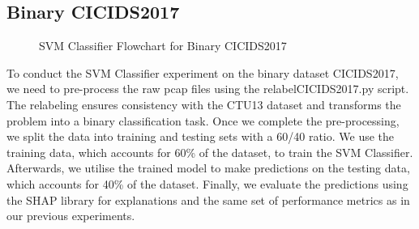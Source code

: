 \subsection{Binary CICIDS2017}\label{subsec:SVMClassifierBinaryCICIDS2017}
\begin{figure}[H]
\centering
{}
\caption{SVM Classifier Flowchart for Binary CICIDS2017}\label{fig:SVMFlowBinaryCICIDS2017}
\end{figure}

To conduct the SVM Classifier experiment on the binary dataset CICIDS2017, we need to pre-process the raw pcap files using the relabelCICIDS2017.py script. The relabeling ensures consistency with the CTU13 dataset and transforms the problem into a binary classification task. Once we complete the pre-processing, we split the data into training and testing sets with a 60/40 ratio. We use the training data, which accounts for 60\% of the dataset, to train the SVM Classifier. Afterwards, we utilise the trained model to make predictions on the testing data, which accounts for 40\% of the dataset. Finally, we evaluate the predictions using the SHAP library for explanations and the same set of performance metrics as in our previous experiments.

